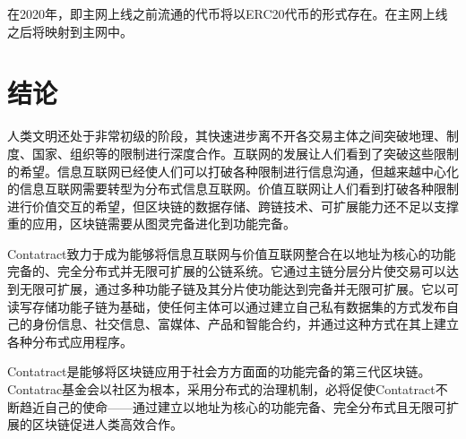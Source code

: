 \documentclass[a4paper,12pt]{article}
\begin{document}
在2020年，即主网上线之前流通的代币将以ERC20代币的形式存在。在主网上线之后将映射到主网中。

\section{结论}
人类文明还处于非常初级的阶段，其快速进步离不开各交易主体之间突破地理、制度、国家、组织等的限制进行深度合作。互联网的发展让人们看到了突破这些限制的希望。信息互联网已经使人们可以打破各种限制进行信息沟通，但越来越中心化的信息互联网需要转型为分布式信息互联网。价值互联网让人们看到打破各种限制进行价值交互的希望，但区块链的数据存储、跨链技术、可扩展能力还不足以支撑重的应用，区块链需要从图灵完备进化到功能完备。

Contatract致力于成为能够将信息互联网与价值互联网整合在以地址为核心的功能完备的、完全分布式并无限可扩展的公链系统。它通过主链分层分片使交易可以达到无限可扩展，通过多种功能子链及其分片使功能达到完备并无限可扩展。它以可读写存储功能子链为基础，使任何主体可以通过建立自己私有数据集的方式发布自己的身份信息、社交信息、富媒体、产品和智能合约，并通过这种方式在其上建立各种分布式应用程序。

Contatract是能够将区块链应用于社会方方面面的功能完备的第三代区块链。Contatrac基金会以社区为根本，采用分布式的治理机制，必将促使Contatract不断趋近自己的使命——通过建立以地址为核心的功能完备、完全分布式且无限可扩展的区块链促进人类高效合作。

\appendix
\clearpage
\renewcommand\refname{参考文献}


\clearpage
\end{document}
